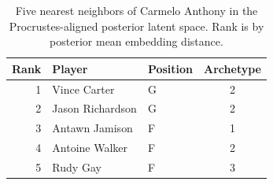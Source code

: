 \begin{table}[htbp]
  \centering\small
  \begin{tabular}{rllc}
    \toprule
    Rank & Player & Position & Archetype \\
    \midrule
    1 & Vince Carter & G & 2 \\
    2 & Jason Richardson & G & 2 \\
    3 & Antawn Jamison & F & 1 \\
    4 & Antoine Walker & F & 2 \\
    5 & Rudy Gay & F & 3 \\
    \bottomrule
  \end{tabular}
  \caption{Five nearest neighbors of Carmelo Anthony in the Procrustes-aligned posterior latent space. Rank is by posterior mean embedding distance.}
  \label{tab:Carmelo_Anthony_neighbors}
\end{table}

